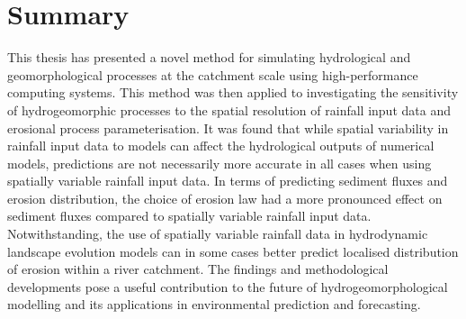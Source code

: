 \section{Summary}
This thesis has presented a novel method for simulating hydrological and geomorphological processes at the catchment scale using high-performance computing systems. This method was then applied to investigating the sensitivity of hydrogeomorphic processes to the spatial resolution of rainfall input data and erosional process parameterisation. It was found that while spatial variability in rainfall input data to models can affect the hydrological outputs of numerical models, predictions are not necessarily more accurate in all cases when using spatially variable rainfall input data. In terms of predicting sediment fluxes and erosion distribution, the choice of erosion law had a more pronounced effect on sediment fluxes compared to spatially variable rainfall input data. Notwithstanding, the use of spatially variable rainfall data in hydrodynamic landscape evolution models can in some cases better predict localised distribution of erosion within a river catchment. The findings and methodological developments pose a useful contribution to the future of hydrogeomorphological modelling and its applications in environmental prediction and forecasting.


